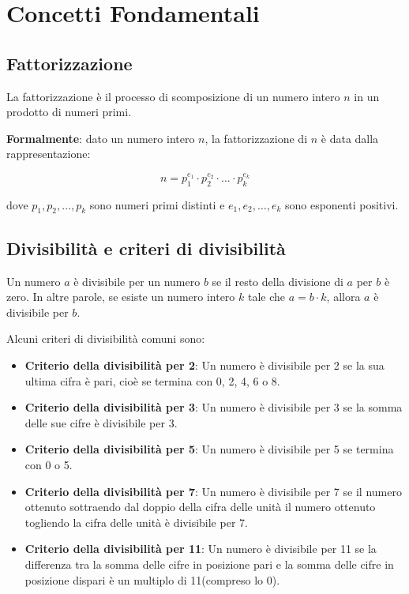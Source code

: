 \documentclass[a4paper,12pt]{report}
\begin{document}
\section{Concetti Fondamentali}
\subsection*{Fattorizzazione}
La fattorizzazione è il processo di scomposizione di un numero intero \( n \) in un prodotto di numeri primi. 

\textbf{Formalmente}: dato un numero intero \( n \), la fattorizzazione di \( n \) è data dalla rappresentazione: 

\[ n = p_1^{e_1} \cdot p_2^{e_2} \cdot \ldots \cdot p_k^{e_k} \]

dove \( p_1, p_2, \ldots, p_k \) sono numeri primi distinti e \( e_1, e_2, \ldots, e_k \) sono esponenti positivi.

\subsection*{Divisibilità e criteri di divisibilità}

Un numero \(a\) è divisibile per un numero \(b\) se il resto della divisione di \(a\) per \(b\) è zero. In altre parole, se esiste un numero intero \(k\) tale che \(a = b \cdot k\), allora \(a\) è divisibile per \(b\).

Alcuni criteri di divisibilità comuni sono:
\begin{itemize}
	\item \textbf{Criterio della divisibilità per 2}: Un numero è divisibile per 2 se la sua ultima cifra è pari, cioè se termina con 0, 2, 4, 6 o 8.
	
	\item \textbf{Criterio della divisibilità per 3}: Un numero è divisibile per 3 se la somma delle sue cifre è divisibile per 3.
	
	\item \textbf{Criterio della divisibilità per 5}: Un numero è divisibile per 5 se termina con 0 o 5.
	
	\item \textbf{Criterio della divisibilità per 7}: Un numero è divisibile per 7 se il numero ottenuto sottraendo dal doppio della cifra delle unità il numero ottenuto togliendo la cifra delle unità è divisibile per 7.

	\item \textbf{Criterio della divisibilità per 11}: Un numero è divisibile per 11 se la differenza tra la somma delle cifre in posizione pari e la somma delle cifre in posizione dispari è un multiplo di 11(compreso lo 0).

\end{itemize}
\end{document}
